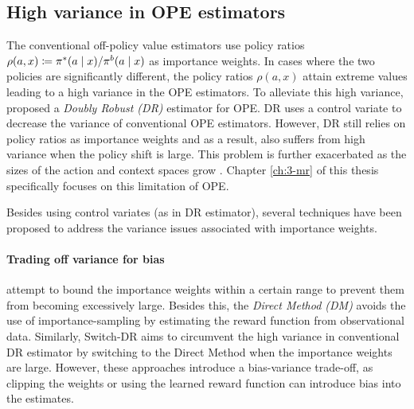 \subsection{High variance in OPE estimators}\label{subsec:high-variance}
The conventional off-policy value estimators use policy ratios $\rho(a, x) \coloneqq \pi^*(a\mid x)/\pi^b(a\mid x)$ as importance weights. 
In cases where the two policies are significantly different, the policy ratios $\rho(a, x)$ attain extreme values leading to a high variance in the OPE estimators. 
To alleviate this high variance, \cite{dudik2014doubly} proposed a \emph{Doubly Robust (DR)} estimator for OPE. 
DR uses a control variate to decrease the variance of conventional OPE estimators. 
However, DR still relies on policy ratios as importance weights and as a result, also suffers from high variance when the policy shift is large. 
This problem is further exacerbated as the sizes of the action and context spaces grow \citep{sachdeva2020off, saito2022off}.
Chapter \ref{ch:3-mr} of this thesis specifically focuses on this limitation of OPE. 

Besides using control variates (as in DR estimator), several techniques have been proposed to address the variance issues associated with importance weights. 

\paragraph{Trading off variance for bias}
\cite{swaminathan2015counterfactual, swaminathan2015the, chaudhuri2019london} attempt to bound the importance weights within a certain range to prevent them from becoming excessively large. 
Besides this, the \emph{Direct Method (DM)} \citep{Beygelzimer2008Offset} avoids the use of importance-sampling by estimating the reward function from observational data.
Similarly, Switch-DR \citep{wang2017optimal} aims to circumvent the high variance in conventional DR estimator by switching to the Direct Method when the importance weights are large.
However, these approaches introduce a bias-variance trade-off, as clipping the weights or using the learned reward function can introduce bias into the estimates. 


